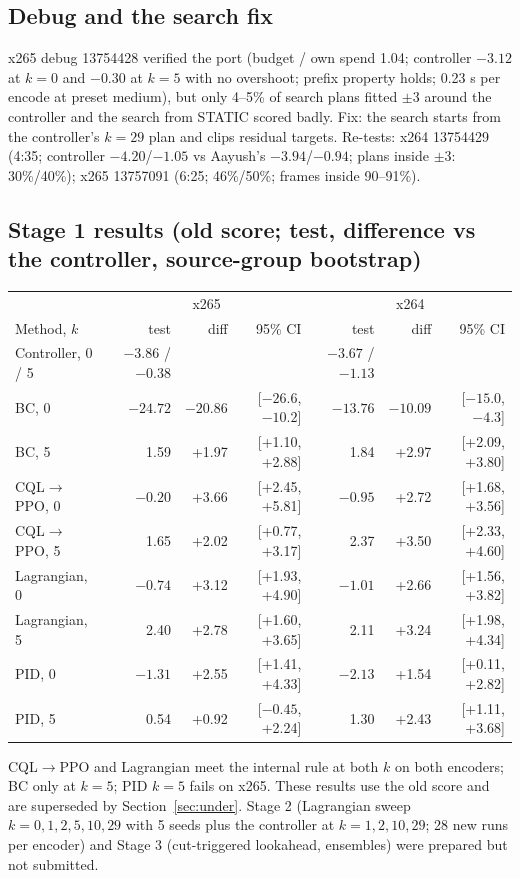 \documentclass[10pt,a4paper]{article}
\begin{document}
\subsection{Debug and the search fix}
x265 debug 13754428 verified the port (budget / own spend 1.04; controller $-3.12$ at $k=0$ and $-0.30$ at $k=5$ with no
overshoot; prefix property holds; 0.23 s per encode at preset medium), but only 4--5\% of search plans fitted $\pm$3
around the controller and the search from STATIC scored badly. Fix: the search starts from the controller's $k=29$
plan and clips residual targets. Re-tests: x264 13754429 (4:35; controller $-4.20$/$-1.05$ vs Aayush's
$-3.94$/$-0.94$; plans inside $\pm$3: 30\%/40\%); x265 13757091 (6:25; 46\%/50\%; frames inside 90--91\%).

\subsection{Stage 1 results (old score; test, difference vs the controller, source-group bootstrap)}
\begin{center}\small
\begin{tabular}{lrrr|rrr}
\toprule
& \multicolumn{3}{c|}{x265} & \multicolumn{3}{c}{x264} \\
Method, $k$ & test & diff & 95\% CI & test & diff & 95\% CI \\\midrule
Controller, 0 / 5 & $-3.86$ / $-0.38$ & & & $-3.67$ / $-1.13$ & & \\
BC, 0 & $-24.72$ & $-20.86$ & [$-26.6$, $-10.2$] & $-13.76$ & $-10.09$ & [$-15.0$, $-4.3$] \\
BC, 5 & 1.59 & +1.97 & [+1.10, +2.88] & 1.84 & +2.97 & [+2.09, +3.80] \\
CQL$\to$PPO, 0 & $-0.20$ & +3.66 & [+2.45, +5.81] & $-0.95$ & +2.72 & [+1.68, +3.56] \\
CQL$\to$PPO, 5 & 1.65 & +2.02 & [+0.77, +3.17] & 2.37 & +3.50 & [+2.33, +4.60] \\
Lagrangian, 0 & $-0.74$ & +3.12 & [+1.93, +4.90] & $-1.01$ & +2.66 & [+1.56, +3.82] \\
Lagrangian, 5 & 2.40 & +2.78 & [+1.60, +3.65] & 2.11 & +3.24 & [+1.98, +4.34] \\
PID, 0 & $-1.31$ & +2.55 & [+1.41, +4.33] & $-2.13$ & +1.54 & [+0.11, +2.82] \\
PID, 5 & 0.54 & +0.92 & [$-0.45$, +2.24] & 1.30 & +2.43 & [+1.11, +3.68] \\
\bottomrule
\end{tabular}
\end{center}
CQL$\to$PPO and Lagrangian meet the internal rule at both $k$ on both encoders; BC only at $k=5$; PID $k=5$ fails on
x265. These results use the old score and are superseded by Section~\ref{sec:under}. Stage 2 (Lagrangian sweep $k=0,1,2,5,10,29$ with 5 seeds plus the
controller at $k=1,2,10,29$; 28 new runs per encoder) and Stage 3 (cut-triggered lookahead, ensembles) were prepared
but not submitted.
\end{document}
